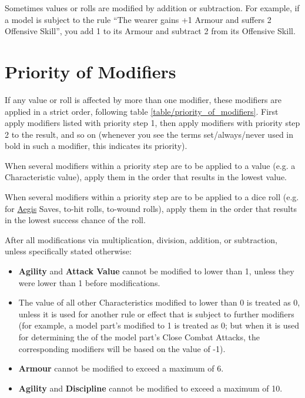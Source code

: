 Sometimes values or rolls are modified by addition or subtraction. For example, if a model is subject to the rule \enquote{The wearer gains +1 Armour and suffers \minuss{}2 Offensive Skill}, you add 1 to its Armour and subtract 2 from its Offensive Skill.

\section{Priority of Modifiers}
\label{priority_of_modifiers}

If any value or roll is affected by more than one modifier, these modifiers are applied in a strict order, following table \ref{table/priority_of_modifiers}. First apply modifiers listed with priority step 1, then apply modifiers with priority step 2 to the result, and so on (whenever you see the terms set/always/never used in bold in such a modifier, this indicates its priority).

When several modifiers within a priority step are to be applied to a value (e.g. a Characteristic value), apply them in the order that results in the lowest value.

When several modifiers within a priority step are to be applied to a dice roll (e.g. for \hyperref[aegis]{Aegis} Saves, to-hit rolls, to-wound rolls), apply them in the order that results in the lowest success chance of the roll.

After all modifications via multiplication, division, addition, or subtraction, unless specifically stated otherwise:

\begin{itemize}
	\item \textbf{Agility} and \textbf{Attack Value} cannot be modified to lower than 1, unless they were lower than 1 before modifications.
	\item The value of all other Characteristics modified to lower than 0 is treated as 0, unless it is used for another rule or effect that is subject to further modifiers (for example, a model part's \ArmourPenetration{} modified to \minuss{}1 is treated as 0; but when it is used for determining the \ArmourPenetration{} of the model part's Close Combat Attacks, the corresponding modifiers will be based on the value of -1).
	\item \textbf{Armour} cannot be modified to exceed a maximum of 6.
	\item \textbf{Agility} and \textbf{Discipline} cannot be modified to exceed a maximum of 10.
\end{itemize}

